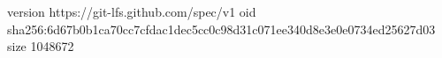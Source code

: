 version https://git-lfs.github.com/spec/v1
oid sha256:6d67b0b1ca70cc7cfdac1dec5cc0c98d31c071ee340d8e3e0e0734ed25627d03
size 1048672
